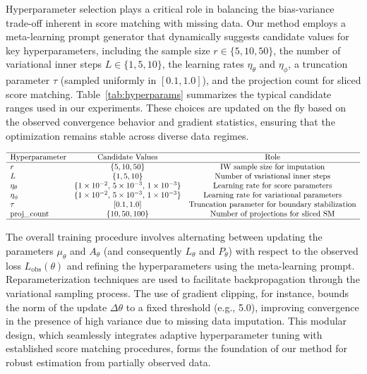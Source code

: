 \documentclass{article}
\begin{document}
Hyperparameter selection plays a critical role in balancing the bias-variance trade-off inherent in score matching with missing data. Our method employs a meta-learning prompt generator that dynamically suggests candidate values for key hyperparameters, including the sample size \(r \in \{5,10,50\}\), the number of variational inner steps \(L \in \{1,5,10\}\), the learning rates \(\eta_\theta\) and \(\eta_\phi\), a truncation parameter \(\tau\) (sampled uniformly in \([0.1,1.0]\)), and the projection count for sliced score matching. Table~\ref{tab:hyperparams} summarizes the typical candidate ranges used in our experiments. These choices are updated on the fly based on the observed convergence behavior and gradient statistics, ensuring that the optimization remains stable across diverse data regimes.

\[
\begin{array}{lcc}
\hline
\text{Hyperparameter} & \text{Candidate Values} & \text{Role} \\
\hline
r & \{5,10,50\} & \text{IW sample size for imputation} \\
L & \{1,5,10\} & \text{Number of variational inner steps} \\
\eta_\theta & \{1\times10^{-2},\,5\times10^{-3},\,1\times10^{-3}\} & \text{Learning rate for score parameters} \\
\eta_\phi & \{1\times10^{-2},\,5\times10^{-3},\,1\times10^{-3}\} & \text{Learning rate for variational parameters} \\
\tau & [0.1,1.0] & \text{Truncation parameter for boundary stabilization} \\
\text{proj\_count} & \{10,50,100\} & \text{Number of projections for sliced SM} \\
\hline
\end{array}
\]
\label{tab:hyperparams}

The overall training procedure involves alternating between updating the parameters \(\mu_\theta\) and \(A_\theta\) (and consequently \(L_\theta\) and \(P_\theta\)) with respect to the observed loss \(L_{\mathrm{obs}}(\theta)\) and refining the hyperparameters using the meta-learning prompt. Reparameterization techniques are used to facilitate backpropagation through the variational sampling process. The use of gradient clipping, for instance, bounds the norm of the update \(\Delta \theta\) to a fixed threshold (e.g., 5.0), improving convergence in the presence of high variance due to missing data imputation. This modular design, which seamlessly integrates adaptive hyperparameter tuning with established score matching procedures, forms the foundation of our method for robust estimation from partially observed data.
\end{document}
